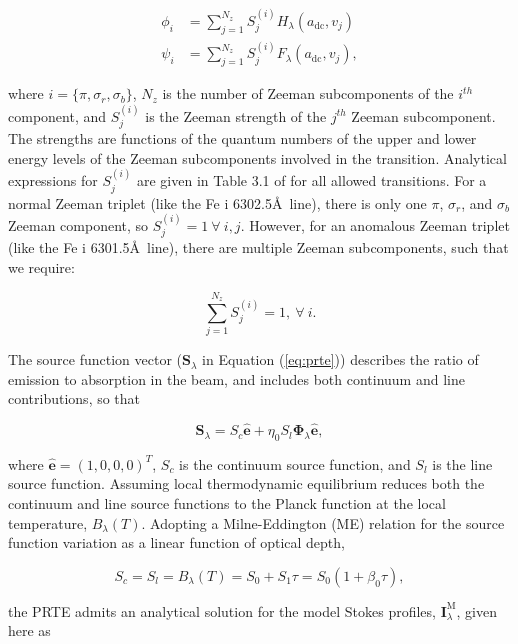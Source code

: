 \documentclass[11pt]{article}
\begin{document}
\begin{align}
\phi_{i} &= \sum_{j=1}^{N_{z}}S_{j}^{(i)}H_{\lambda}(a_{\mathrm{dc}},v_{j})\\
\psi_{i} &= \sum_{j=1}^{N_{z}}S_{j}^{(i)}F_{\lambda}(a_{\mathrm{dc}},v_{j}),
\end{align}

where $i = \lbrace\pi,\sigma_{r},\sigma_{b}\rbrace$, $N_{z}$ is the number of Zeeman subcomponents
of the $i^{th}$ component, and $S_{j}^{(i)}$ is the Zeeman strength of the $j^{th}$ Zeeman subcomponent.
The strengths are functions of the quantum numbers of the upper and lower energy levels of the Zeeman
subcomponents involved in the transition.  Analytical expressions for $S_{j}^{(i)}$ are given in
Table 3.1 of \citet{deglinnocenti:2004} for all allowed transitions.  For a normal Zeeman triplet (like
the Fe {\sc i} 6302.5\AA\ line), there is only one $\pi$, $\sigma_{r}$, and $\sigma_{b}$ Zeeman component,
so $S_{j}^{(i)} = 1\ \forall\ i,j$.  However, for an anomalous Zeeman triplet (like the Fe {\sc i}
6301.5\AA\ line), there are multiple Zeeman subcomponents, such that we require:

\begin{equation}
\sum_{j=1}^{N_{z}}S_{j}^{(i)} = 1,\ \forall\ i.
\end{equation}

The source function vector ($\mathbf{S}_{\lambda}$ in Equation (\ref{eq:prte})) describes the ratio of
emission to absorption in the beam, and includes both continuum and line contributions, so that

\begin{equation}
\mathbf{S}_{\lambda} = S_{c}\hat{\mathbf{e}} + \eta_{0}S_{l}\mathbf{\Phi}_{\lambda}\hat{\mathbf{e}},
\end{equation}

where $\hat{\mathbf{e}} = \left(1,0,0,0\right)^{T}$, $S_{c}$ is the continuum source
function, and $S_{l}$ is the line source function.  Assuming local thermodynamic equilibrium
reduces both the continuum and line source functions to the Planck function at the local temperature,
$B_{\lambda}(T)$.  Adopting a Milne-Eddington (ME) relation for the source function variation
as a linear function of optical depth,

\begin{equation}
S_{c} = S_{l} = B_{\lambda}(T) = S_{0} + S_{1}\tau = S_{0}(1 + \beta_{0}\tau),
\end{equation}

the PRTE admits an analytical solution for the model Stokes profiles,
$\mathbf{I}_{\lambda}^{\mathrm{M}}$, given here as
\end{document}

